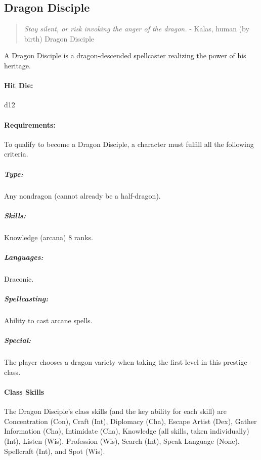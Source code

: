 \subsection{Dragon Disciple}
\begin{quote}
\emph{Stay silent, or risk invoking the anger of the dragon.}
- Kalas, human (by birth) Dragon Disciple
\end{quote}
A Dragon Disciple is a dragon-descended spellcaster realizing the power of his heritage.
\paragraph{Hit Die:} d12
\paragraph{Requirements:}
To qualify to become a Dragon Disciple, a character must fulfill all the following criteria.
\subparagraph{Type:} Any nondragon (cannot already be a half-dragon).
\subparagraph{Skills:} Knowledge (arcana) 8 ranks.
\subparagraph{Languages:} Draconic.
\subparagraph{Spellcasting:} Ability to cast arcane spells.
\subparagraph{Special:} The player chooses a dragon variety when taking the first level in this prestige class.
\paragraph{Class Skills}
The Dragon Disciple's class skills (and the key ability for each skill) are Concentration (Con), Craft (Int), Diplomacy (Cha), 
Escape Artist (Dex), Gather Information (Cha), Intimidate (Cha), Knowledge (all skills, taken individually) (Int), 
Listen (Wis), Profession (Wis), Search (Int), Speak Language (None), Spellcraft (Int), and Spot (Wis).
